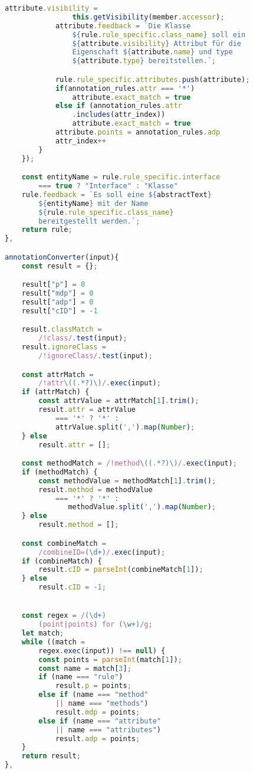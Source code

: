 \begin{lstlisting}[caption={Class Definition Rule}, label={lst:rule_object_gen}, language=javascript]
            attribute.visibility =
                this.getVisibility(member.accessor);
            attribute.feedback = `Die Klasse
                ${rule.rule_specific.class_name} soll ein
                ${attribute.visibility} Attribut für die
                Eigenschaft ${attribute.name} und type
                ${attribute.type} bereitstellen.`;

            rule.rule_specific.attributes.push(attribute);
            if(annotation_rules.attr === '*')
                attribute.exact_match = true
            else if (annotation_rules.attr
                .includes(attr_index))
                attribute.exact_match = true
            attribute.points = annotation_rules.adp
            attr_index++
        }
    });

    const entityName = rule.rule_specific.interface
        === true ? "Interface" : "Klasse"
    rule.feedback = `Es soll eine ${abstractText}
        ${entityName} mit der Name
        ${rule.rule_specific.class_name}
        bereitgestellt werden.`;
    return rule;
},

annotationConverter(input){
    const result = {};

    result["p"] = 0
    result["mdp"] = 0
    result["adp"] = 0
    result["cID"] = -1

    result.classMatch =
        /!class/.test(input);
    result.ignoreClass =
        /!ignoreClass/.test(input);

    const attrMatch =
        /!attr\((.*?)\)/.exec(input);
    if (attrMatch) {
        const attrValue = attrMatch[1].trim();
        result.attr = attrValue
            === '*' ? '*' :
            attrValue.split(',').map(Number);
    } else
        result.attr = [];

    const methodMatch = /!method\((.*?)\)/.exec(input);
    if (methodMatch) {
        const methodValue = methodMatch[1].trim();
        result.method = methodValue
            === '*' ? '*' :
               methodValue.split(',').map(Number);
    } else
        result.method = [];

    const combineMatch =
        /combineID=(\d+)/.exec(input);
    if (combineMatch) {
        result.cID = parseInt(combineMatch[1]);
    } else
        result.cID = -1;


    const regex = /(\d+)
        (point|points) for (\w+)/g;
    let match;
    while ((match =
        regex.exec(input)) !== null) {
        const points = parseInt(match[1]);
        const name = match[3];
        if (name === "rule")
            result.p = points;
        else if (name === "method"
            || name === "methods")
            result.mdp = points;
        else if (name === "attribute"
            || name === "attributes")
            result.adp = points;
    }
    return result;
},
\end{lstlisting}

